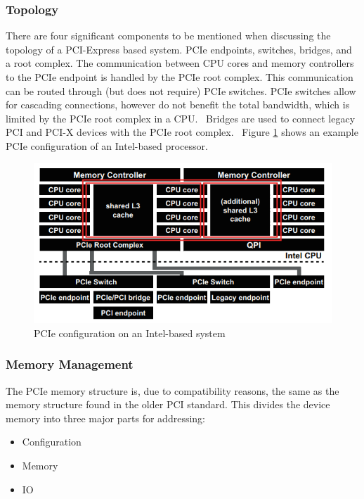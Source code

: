 \subsubsection{Topology}
There are four significant components to be mentioned when discussing the topology of a PCI-Express based system. PCIe endpoints, switches, bridges, and a root complex. 
The communication between CPU cores and memory controllers to the PCIe endpoint is handled by the PCIe root complex. This communication can be routed through (but does not require) PCIe switches. PCIe switches allow for cascading connections, however do not benefit the total bandwidth, which is limited by the PCIe root complex in a CPU.~\parencite{nakamura_thorough_2017}
Bridges are used to connect legacy PCI and PCI-X devices with the PCIe root complex.~\parencite{pci-sig_pci_2011}
Figure \ref{fig:topology} shows an example PCIe configuration of an Intel-based processor.

\begin{figure}
\includegraphics[width = \linewidth]{figures/PCIE-topology}
\caption{PCIe configuration on an Intel-based system\cite{nakamura_thorough_2017}}
\label{fig:topology}
\end{figure}
\subsubsection{Memory Management}
\label{sec:memory}

The PCIe memory structure is, due to compatibility reasons, the same as the memory structure found in the older PCI standard. This divides the device memory into three major parts for addressing:\cite{jackson_pci_2012}
\begin{itemize}
\item Configuration
\item Memory
\item IO
\end{itemize}

